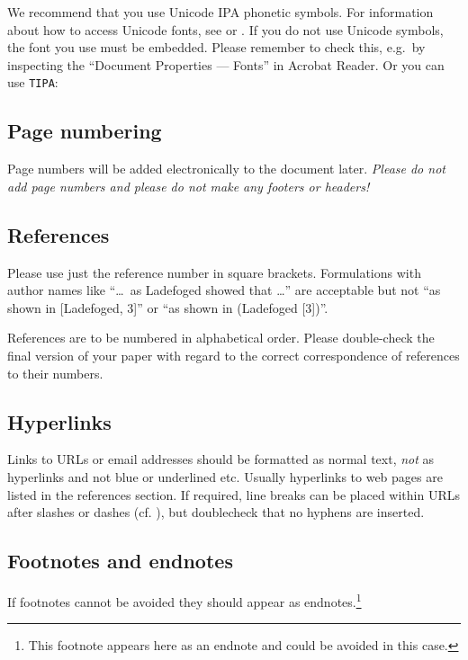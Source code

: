 \documentclass[a4paper,11pt,twocolumn]{article}
\let\rmarkdownfootnote\footnote%
\def\footnote{\protect\rmarkdownfootnote}
\begin{document}
We recommend that you use Unicode IPA phonetic symbols. For information
about how to access Unicode fonts, see \cite{IPA-SIL} or
\cite{IPA-KEYBOARD}. If you do not use Unicode symbols, the font you use
must be embedded. Please remember to check this, e.g.~by inspecting the
``Document Properties --- Fonts'' in Acrobat Reader. Or you can use
\texttt{TIPA}: 

\subsection{Page numbering}

Page numbers will be added electronically to the document later.
\textit{Please do not add page numbers and please do not make any footers or 
headers!}

\subsection{References}

Please use just the reference number in square brackets. Formulations
with author names like ``\ldots~as Ladefoged \cite{Ladefoged:2003}
showed that \ldots'' are acceptable but not ``as shown in {[}Ladefoged,
3{]}'' or ``as shown in (Ladefoged {[}3{]})''.

References are to be numbered in alphabetical order. Please double-check
the final version of your paper with regard to the correct
correspondence of references to their numbers.

\subsection{Hyperlinks}

Links to URLs or email addresses should be formatted as normal text,
\textit{not} as hyperlinks and not blue or underlined etc. Usually
hyperlinks to web pages are listed in the references section. If
required, line breaks can be placed within URLs after slashes or dashes
(cf. \cite{IPA-SIL, IPA-KEYBOARD}), but doublecheck that no hyphens are
inserted.

\subsection{Footnotes and endnotes}

If footnotes cannot be avoided they should appear as
endnotes.\footnote{This 
footnote appears here as an endnote and could be avoided in this case.}
\end{document}
